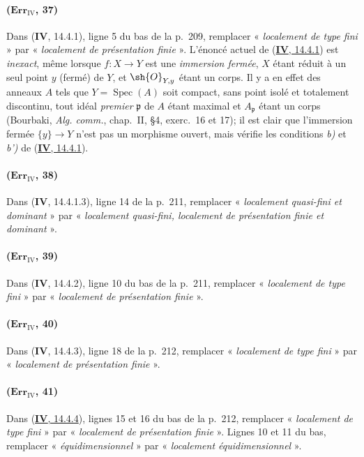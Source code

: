 \paragraph{($\mathbf{Err}_{\mathrm{IV}}$, 37)}
Dans (\textbf{IV}, 14.4.1), ligne 5 du bas de la p.~209, remplacer « \emph{localement
de type fini} » par « \emph{localement de présentation finie} ». L'énoncé
actuel de ({\hyperref[canon-index.ega4.c04.thm.14-4-1]{\textbf{IV}, 14.4.1}}) est \emph{inexact},
même lorsque $f:X\to Y$ est une \emph{immersion fermée}, $X$ étant réduit à
un seul point $y$ (fermé) de $Y$, et $\sh{O}_{Y,y}$ étant un corps. Il
y a en effet des anneaux $A$ tels que $Y=\operatorname{Spec}(A)$ soit
compact, sans point isolé et totalement discontinu, tout idéal \emph{premier}
$\mathfrak p$ de $A$ étant maximal et $A_\mathfrak p$ étant un corps
(Bourbaki, \emph{Alg. comm.}, chap.~II, \S4, exerc.~16 et 17); il est
clair que l'immersion fermée $\{y\}\to Y$ n'est pas un morphisme
ouvert, mais vérifie les conditions \emph{b)} et \emph{b')} de
({\hyperref[canon-index.ega4.c04.thm.14-4-1]{\textbf{IV}, 14.4.1}}).

\paragraph{($\mathbf{Err}_{\mathrm{IV}}$, 38)}
Dans (\textbf{IV}, 14.4.1.3), ligne 14 de la p.~211, remplacer « \emph{localement
quasi-fini et dominant} » par « \emph{localement quasi-fini, localement de
présentation finie et dominant} ».

\paragraph{($\mathbf{Err}_{\mathrm{IV}}$, 39)}
Dans (\textbf{IV}, 14.4.2), ligne 10 du bas de la p.~211, remplacer « \emph{localement
de type fini} » par « \emph{localement de présentation finie} ».

\paragraph{($\mathbf{Err}_{\mathrm{IV}}$, 40)}
Dans (\textbf{IV}, 14.4.3), ligne 18 de la p.~212, remplacer « \emph{localement de
type fini} » par « \emph{localement de présentation finie} ».

\paragraph{($\mathbf{Err}_{\mathrm{IV}}$, 41)}
Dans ({\hyperref[canon-index.ega4.c04.cor.14-4-4]{\textbf{IV}, 14.4.4}}), lignes 15 et 16 du
bas de la p.~212, remplacer « \emph{localement de type fini} » par
« \emph{localement de présentation finie} ». Lignes 10 et 11 du bas, remplacer
« \emph{équidimensionnel} » par « \emph{localement équidimensionnel} ».

